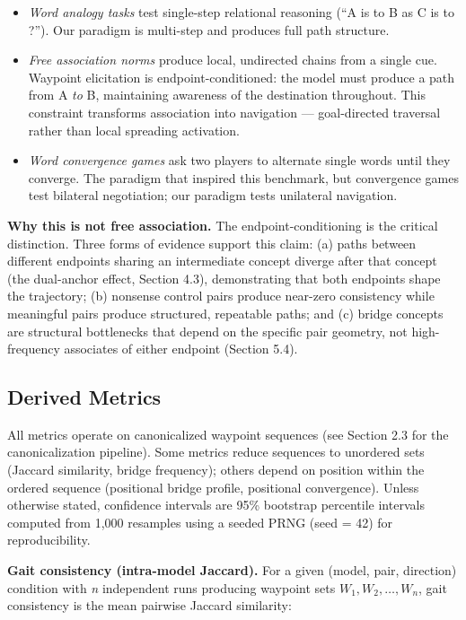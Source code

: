 \begin{itemize}
\tightlist
\item
  \emph{Word analogy tasks} \citep{mikolov2013distributed} test single-step relational reasoning (``A is to B as C is to ?''). Our paradigm is multi-step and produces full path structure.
\item
  \emph{Free association norms} \citep{nelson2004university,llmwow2025} produce local, undirected chains from a single cue. Waypoint elicitation is endpoint-conditioned: the model must produce a path from A \emph{to} B, maintaining awareness of the destination throughout. This constraint transforms association into navigation --- goal-directed traversal rather than local spreading activation.
\item
  \emph{Word convergence games} \citep{hodge2025convergence} ask two players to alternate single words until they converge. The paradigm that inspired this benchmark, but convergence games test bilateral negotiation; our paradigm tests unilateral navigation.
\end{itemize}

\textbf{Why this is not free association.} The endpoint-conditioning is the critical distinction. Three forms of evidence support this claim: (a) paths between different endpoints sharing an intermediate concept diverge after that concept (the dual-anchor effect, Section 4.3), demonstrating that both endpoints shape the trajectory; (b) nonsense control pairs produce near-zero consistency while meaningful pairs produce structured, repeatable paths; and (c) bridge concepts are structural bottlenecks that depend on the specific pair geometry, not high-frequency associates of either endpoint (Section 5.4).

\subsection{Derived Metrics}\label{derived-metrics}

All metrics operate on canonicalized waypoint sequences (see Section 2.3 for the canonicalization pipeline). Some metrics reduce sequences to unordered sets (Jaccard similarity, bridge frequency); others depend on position within the ordered sequence (positional bridge profile, positional convergence). Unless otherwise stated, confidence intervals are 95\% bootstrap percentile intervals computed from 1,000 resamples using a seeded PRNG (seed = 42) for reproducibility.

\textbf{Gait consistency (intra-model Jaccard).} For a given (model, pair, direction) condition with \emph{n} independent runs producing waypoint sets \(W_1, W_2, \ldots, W_n\), gait consistency is the mean pairwise Jaccard similarity:

